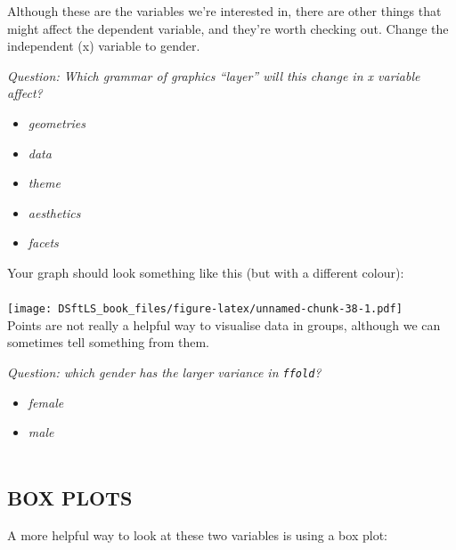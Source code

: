 \documentclass[
]{book}
\providecommand{\tightlist}{%
  \setlength{\itemsep}{0pt}\setlength{\parskip}{0pt}}
\begin{document}
Although these are the variables we're interested in, there are other things that
might affect the dependent variable, and they're worth checking out. Change the
independent (x) variable to gender.

\emph{Question: Which grammar of graphics ``layer'' will this change in x variable affect?}

\begin{itemize}
\tightlist
\item
  \emph{geometries}
\item
  \emph{data}
\item
  \emph{theme}
\item
  \emph{aesthetics}
\item
  \emph{facets}\\
\end{itemize}

Your graph should look something like this (but with a different colour):\\
~\\
\texttt{[image: DSftLS\_book\_files/figure-latex/unnamed-chunk-38-1.pdf]}\\

Points are not really a helpful way to visualise data in groups, although
we can sometimes tell something from them.

\emph{Question: which gender has the larger variance in \texttt{ffold}?}

\begin{itemize}
\tightlist
\item
  \emph{female}
\item
  \emph{male}\\
  ~\\
\end{itemize}

\hypertarget{box-plots}{%
\subsection{BOX PLOTS}\label{box-plots}}

A more helpful way to look at these two variables is using a box plot:
\end{document}
